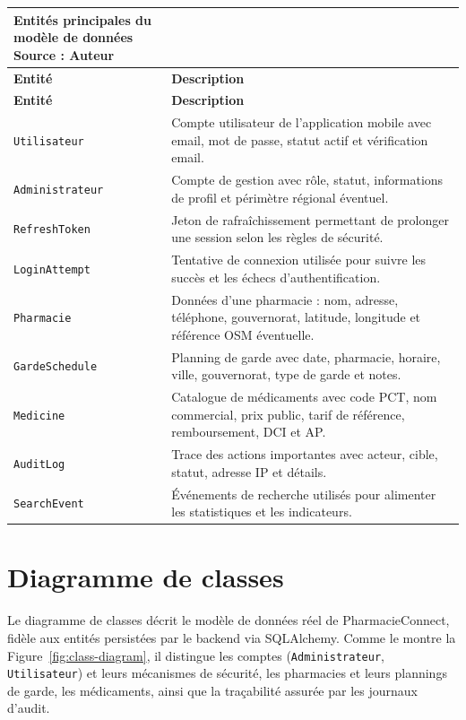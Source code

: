 \begin{longtable}{L{4cm}L{10cm}}
    \caption{Entités principales du modèle de données\\ \small Source : Auteur}\label{tab:entites-donnees}\\
    \toprule
    \textbf{Entité} & \textbf{Description} \\
    \midrule
    \endfirsthead
    \toprule
    \textbf{Entité} & \textbf{Description} \\
    \midrule
    \endhead
    \texttt{Utilisateur} & Compte utilisateur de l'application mobile avec email, mot de passe, statut actif et vérification email. \\
    \texttt{Administrateur} & Compte de gestion avec rôle, statut, informations de profil et périmètre régional éventuel. \\
    \texttt{RefreshToken} & Jeton de rafraîchissement permettant de prolonger une session selon les règles de sécurité. \\
    \texttt{LoginAttempt} & Tentative de connexion utilisée pour suivre les succès et les échecs d'authentification. \\
    \texttt{Pharmacie} & Données d'une pharmacie : nom, adresse, téléphone, gouvernorat, latitude, longitude et référence OSM éventuelle. \\
    \texttt{GardeSchedule} & Planning de garde avec date, pharmacie, horaire, ville, gouvernorat, type de garde et notes. \\
    \texttt{Medicine} & Catalogue de médicaments avec code PCT, nom commercial, prix public, tarif de référence, remboursement, DCI et AP. \\
    \texttt{AuditLog} & Trace des actions importantes avec acteur, cible, statut, adresse IP et détails. \\
    \texttt{SearchEvent} & Événements de recherche utilisés pour alimenter les statistiques et les indicateurs. \\
    \bottomrule
\end{longtable}

\section{Diagramme de classes}

Le diagramme de classes décrit le modèle de données réel de PharmacieConnect, fidèle aux entités persistées
par le backend via SQLAlchemy. Comme le montre la Figure~\ref{fig:class-diagram}, il distingue les comptes
(\texttt{Administrateur}, \texttt{Utilisateur}) et leurs mécanismes de sécurité, les pharmacies et leurs
plannings de garde, les médicaments, ainsi que la traçabilité assurée par les journaux d'audit.

